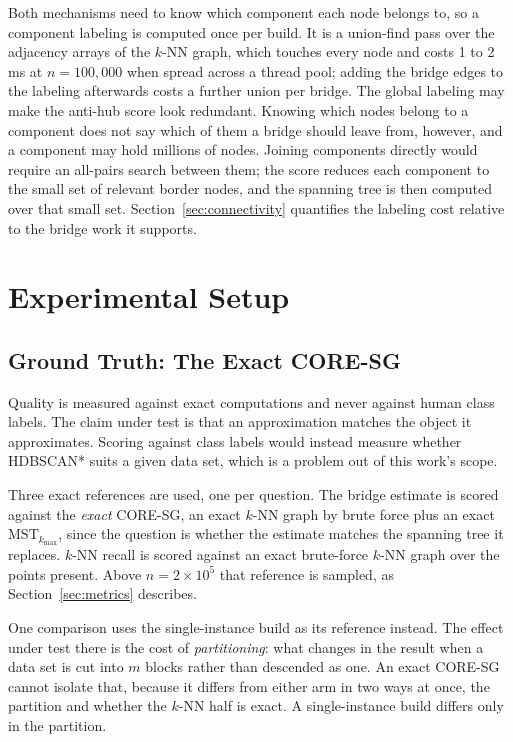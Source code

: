 \documentclass{ieeeaccess}
\newcommand{\kmax}{k_{\max}}
\begin{document}
Both mechanisms need to know which component each node belongs to, so a
component labeling is computed once per build. It is a union-find pass over
the adjacency arrays of the $k$-NN graph, which touches every node and costs
1 to 2\,ms at $n = 100{,}000$ when spread across a thread pool; adding the
bridge edges to the labeling afterwards costs a further union per bridge. The
global labeling may make the anti-hub score look redundant. Knowing which nodes
belong to a component does not say which of them a bridge should leave from,
however, and a component may hold millions of nodes. Joining components
directly would require an all-pairs search between them; the score reduces
each component to the small set of relevant border nodes, and the
spanning tree is then computed over that small set. Section~\ref{sec:connectivity}
quantifies the labeling cost relative to the bridge work it supports.

\section{Experimental Setup}
\label{sec:setup}

\subsection{Ground Truth: The Exact CORE-SG}
\label{sec:groundtruth}

Quality is measured against exact computations and never against human class
labels. The claim under test is that an approximation matches the object it
approximates. Scoring against class labels would instead measure whether
HDBSCAN* suits a given data set, which is a problem out of this work's scope.

Three exact references are used, one per question. The bridge estimate is scored
against the \emph{exact} CORE-SG, an exact $k$-NN graph by brute force plus an
exact $\mathrm{MST}_{\kmax}$, since the question is whether the estimate matches
the spanning tree it replaces. $k$-NN recall is scored against an exact
brute-force $k$-NN graph over the points present. Above $n = 2\times10^5$ that
reference is sampled, as Section~\ref{sec:metrics} describes.

One comparison uses the single-instance build as its reference instead. The
effect under test there is the cost of \emph{partitioning}: what changes in the
result when a data set is cut into $m$ blocks rather than descended as one. An
exact CORE-SG cannot isolate that, because it differs from either arm in two
ways at once, the partition and whether the $k$-NN half is exact. A
single-instance build differs only in the partition.
\end{document}

